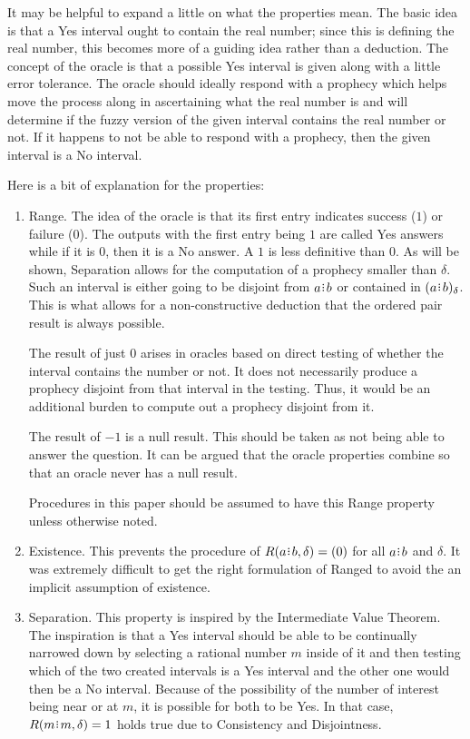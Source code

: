 \documentclass[12pt]{article}
\begin{document}
It may be helpful to expand a little on what the properties mean. The basic idea is that a Yes interval ought to contain the real number; since this is defining the real number, this becomes more of a guiding idea rather than a deduction. The concept of the oracle is that a possible Yes interval is given along with a little error tolerance. The oracle should ideally respond with a prophecy which helps move the process along in ascertaining what the real number is and will determine if the fuzzy version of the given interval contains the real number or not. If it happens to not be able to respond with a prophecy, then the given interval is a No interval. 

Here is a bit of explanation for the properties: 
\begin{enumerate}
    \item Range. The idea of the oracle is that its first entry indicates success ($1$) or failure ($0$). The outputs with the first entry being $1$ are called Yes answers while if it is $0$, then it is a No answer. A $1$ is less definitive than $0$. As will be shown, Separation allows for the computation of a prophecy smaller than $\delta$. Such an interval is either going to be disjoint from $a \rint b$ or contained in $\halo{a\rint b}$. This is what allows for a non-constructive deduction that the ordered pair result is always possible. 

    The result of just $0$ arises in oracles based on direct testing of whether the interval contains the number or not. It does not necessarily produce a prophecy disjoint from that interval in the testing. Thus, it would be an additional burden to compute out a prophecy disjoint from it. 

    The result of $-1$ is a null result. This should be taken as not being able to answer the question. It can be argued that the oracle properties combine so that an oracle never has a null result. 

    Procedures in this paper should be assumed to have this Range property unless otherwise noted. 

    \item Existence. This prevents the procedure of $R(a\rint b, \delta) = (0)$ for all $a\rint b$ and $\delta$. It was extremely difficult to get the right formulation of Ranged to avoid the an implicit assumption of existence. 

    \item Separation. This property is inspired by the Intermediate Value Theorem. The inspiration is that a Yes interval should be able to be continually narrowed down by selecting a rational number $m$ inside of it and then testing which of the two created intervals is a Yes interval and the other one would then be a No interval. Because of the possibility of the number of interest being near or at $m$, it is possible for both to be Yes. In that case, $R(m\rint m, \delta) = 1$ holds true due to Consistency and Disjointness. 
    

\end{enumerate}
\end{document}

